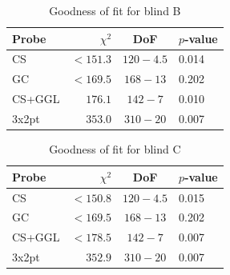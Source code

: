 \begin{table}
	\begin{center}
		\caption{Goodness of fit for blind B}
		\label{tab:goodness-of-fit}
\begin{tabular}{lrcl}
    \toprule
    Probe             & $\chi^2$       & DoF       & $p$-value   \\
    \midrule
	CS               & $< 151.3$ & $120-4.5$ & 0.014 \\
	GC               & $< 169.5$ & $168-13$ & 0.202 \\
	CS+GGL           & $176.1$ & $142-7$ & 0.010 \\
	3x2pt            & $353.0$ & $310-20$ & 0.007 \\

    \bottomrule
\end{tabular}
	\end{center}
\end{table}

\begin{table}
	\begin{center}
		\caption{Goodness of fit for blind C}
		\label{tab:goodness-of-fit}
\begin{tabular}{lrcl}
    \toprule
    Probe             & $\chi^2$       & DoF       & $p$-value   \\
    \midrule
	CS               & $< 150.8$ & $120-4.5$ & 0.015 \\
	GC               & $< 169.5$ & $168-13$ & 0.202 \\
	CS+GGL           & $< 178.5$ & $142-7$ & 0.007 \\
	3x2pt            & $352.9$ & $310-20$ & 0.007 \\

    \bottomrule
\end{tabular}
	\end{center}
\end{table}

